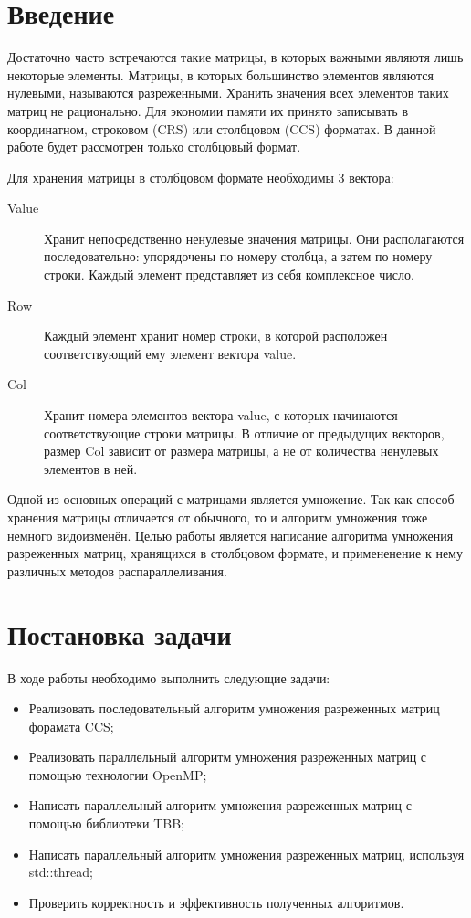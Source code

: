 \documentclass{report}
\begin{document}
\setcounter{page}{2}

\tableofcontents
\newpage

\section*{Введение}
Достаточно часто встречаются такие матрицы, в которых важными являютя лишь некоторые элементы. Матрицы, в которых большинство элементов являются нулевыми, называются разреженными. Хранить значения всех элементов таких матриц не рационально. Для экономии памяти их принято записывать в координатном, строковом (CRS) или столбцовом (CCS) форматах. В данной работе будет рассмотрен только столбцовый формат.
\par Для хранения матрицы в столбцовом формате необходимы 3 вектора:
\begin{description}
	\item [Value] Хранит непосредственно ненулевые значения матрицы. Они располагаются последовательно: упорядочены по номеру столбца, а затем по номеру строки. Каждый элемент представляет из себя комплексное число.
	\item [Row] Каждый элемент хранит номер строки, в которой расположен соответствующий ему элемент вектора value.
	\item [Col] Хранит номера элементов вектора value, с которых начинаются соответствующие строки матрицы. В отличие от предыдущих векторов, размер Col зависит от размера матрицы, а не от количества ненулевых элементов в ней.
\end{description}
\par Одной из основных операций с матрицами является умножение. Так как способ хранения матрицы отличается от обычного, то и алгоритм умножения тоже немного видоизменён. Целью работы является написание алгоритма умножения разреженных матриц, хранящихся в столбцовом формате, и примененение к нему различных методов распараллеливания.
\newpage



\section*{Постановка задачи}
В ходе работы необходимо выполнить следующие задачи:
\begin {itemize}
	\item Реализовать последовательный алгоритм умножения разреженных матриц форамата CCS;
	\item Реализовать параллельный алгоритм умножения разреженных матриц с помощью технологии OpenMP;
	\item Написать параллельный алгоритм умножения разреженных матриц с помощью библиотеки TBB;
	\item Написать параллельный алгоритм умножения разреженных матриц, используя std::thread;
	\item Проверить корректность и эффективность полученных алгоритмов.
\end {itemize}
\newpage
\end{document}
